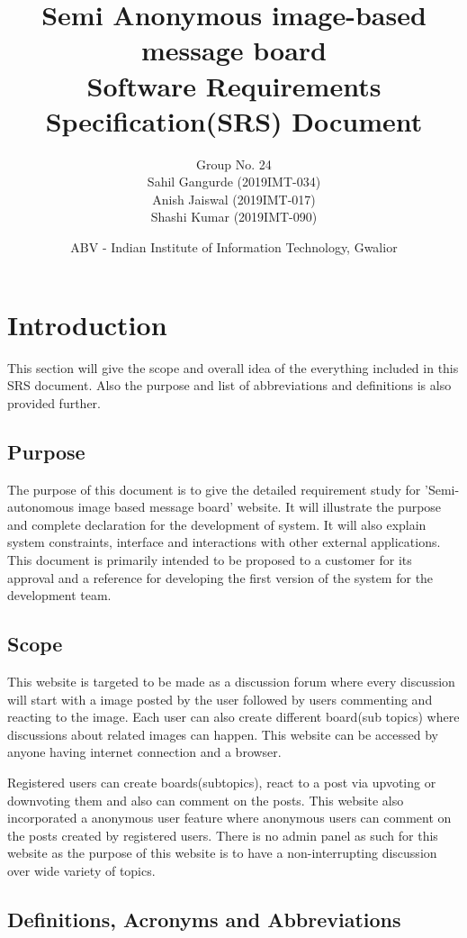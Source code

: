 \documentclass[12pt]{report}
\title{Semi Anonymous image-based message board \\ 
        \large Software Requirements Specification(SRS) Document}
\author{Group No. 24\\Sahil Gangurde (2019IMT-034)\\Anish Jaiswal (2019IMT-017)\\Shashi Kumar (2019IMT-090)}
\date{ABV - Indian Institute of Information Technology, Gwalior}
\begin{document}
\maketitle

\newpage
\tableofcontents
\newpage

\chapter{Introduction}
This section will give the scope and overall idea of the everything included in this SRS document. Also the purpose and list of abbreviations and definitions is also provided further.

\section{Purpose}
The purpose of this document is to give the detailed requirement study for 'Semi-autonomous image based message board' website. It will illustrate the purpose and complete declaration for the development of system. It will also explain system constraints, interface and interactions with other external applications. This document is primarily intended to be proposed to a customer for its approval and a reference for developing the first version of the system for the development team.

\section{Scope}
This website is targeted to be made as a discussion forum where every discussion will start with a image posted by the user followed by users commenting and reacting to the image. Each user can also create different board(sub topics) where discussions about related images can happen. This website can be accessed by anyone having internet connection and a browser.

Registered users can create boards(subtopics), react to a post via upvoting or downvoting them and also can comment on the posts. This website also incorporated a anonymous user feature where anonymous users can comment on the posts created by registered users. There is no admin panel as such for this website as the purpose of this website is to have a non-interrupting discussion over wide variety of topics.

\section{Definitions, Acronyms and Abbreviations}
\end{document}
